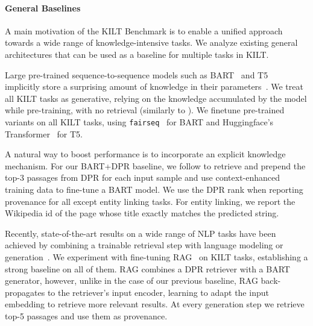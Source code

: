 \documentclass[11pt]{article}
\begin{document}
\paragraph{General Baselines}
A main motivation of the KILT Benchmark is to enable a unified approach towards a wide range of knowledge-intensive tasks. We analyze existing general architectures that can be used as a baseline for multiple tasks in KILT.

Large pre-trained sequence-to-sequence models such as BART~\cite{Lewis2019BARTDS} and T5~\cite{2019t5} implicitly store a surprising amount of knowledge in their parameters~\cite{petroni2019language}. We treat all KILT tasks as generative, relying on the knowledge accumulated by the model while pre-training, with no retrieval (similarly to \citet{roberts2020much}). We finetune pre-trained variants on all KILT tasks, using \texttt{fairseq}~\cite{ott2019fairseq} for BART and Huggingface’s Transformer~\cite{wolf2019huggingface} for T5.




A natural way to boost performance is to incorporate an explicit knowledge mechanism.
For our BART+DPR baseline,
we follow \citet{petroni2020context} to retrieve and prepend the top-3 passages from DPR for each input sample and use context-enhanced training data to fine-tune a BART model.
We use the DPR rank when reporting provenance for all except entity linking tasks. For entity linking, we report the Wikipedia id of the page whose title exactly matches the predicted string. 


Recently, state-of-the-art results on a wide range of NLP tasks have been achieved by combining a trainable retrieval step with language modeling or generation~\cite{guu2020realm,lewis2020pre}. We experiment with fine-tuning RAG~\cite{lewis2020retrievalaugmented} on KILT tasks, establishing a strong baseline on all of them.
RAG combines a DPR retriever with a BART generator, however, unlike in the case of our previous baseline, RAG back-propagates to the retriever's input encoder, learning to adapt the input embedding to retrieve more relevant results. 
At every generation step we retrieve top-5 passages and use them as provenance.
\end{document}
